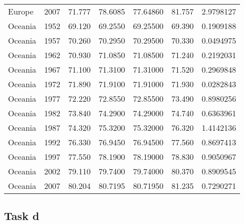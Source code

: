\documentclass[
]{article}
\begin{document}
\begin{longtable}[]{@{}lrrrrrr@{}}
Europe & 2007 & 71.777 & 78.6085 & 77.64860 & 81.757 & 2.9798127 \\
Oceania & 1952 & 69.120 & 69.2550 & 69.25500 & 69.390 & 0.1909188 \\
Oceania & 1957 & 70.260 & 70.2950 & 70.29500 & 70.330 & 0.0494975 \\
Oceania & 1962 & 70.930 & 71.0850 & 71.08500 & 71.240 & 0.2192031 \\
Oceania & 1967 & 71.100 & 71.3100 & 71.31000 & 71.520 & 0.2969848 \\
Oceania & 1972 & 71.890 & 71.9100 & 71.91000 & 71.930 & 0.0282843 \\
Oceania & 1977 & 72.220 & 72.8550 & 72.85500 & 73.490 & 0.8980256 \\
Oceania & 1982 & 73.840 & 74.2900 & 74.29000 & 74.740 & 0.6363961 \\
Oceania & 1987 & 74.320 & 75.3200 & 75.32000 & 76.320 & 1.4142136 \\
Oceania & 1992 & 76.330 & 76.9450 & 76.94500 & 77.560 & 0.8697413 \\
Oceania & 1997 & 77.550 & 78.1900 & 78.19000 & 78.830 & 0.9050967 \\
Oceania & 2002 & 79.110 & 79.7400 & 79.74000 & 80.370 & 0.8909545 \\
Oceania & 2007 & 80.204 & 80.7195 & 80.71950 & 81.235 & 0.7290271 \\
\end{longtable}

\subsection{Task d}\label{task-d}
\end{document}
